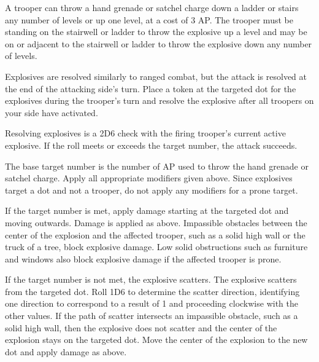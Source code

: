 A trooper can throw a hand grenade or satchel charge down a ladder or stairs any number of levels or up one level, at a cost of 3 AP.
The trooper must be standing on the stairwell or ladder to throw the explosive up a level and may be on or adjacent to the stairwell or ladder to throw the explosive down any number of levels.

Explosives are resolved similarly to ranged combat, but the attack is resolved at the end of the attacking side's turn.
Place a token at the targeted dot for the explosives during the trooper's turn and resolve the explosive after all troopers on your side have activated.

Resolving explosives is a 2D6 check with the firing trooper's current active explosive.
If the roll meets or exceeds the target number, the attack succeeds.

The base target number is the number of AP used to throw the hand grenade or satchel charge.
Apply all appropriate modifiers given above.
Since explosives target a dot and not a trooper, do not apply any modifiers for a prone target.

If the target number is met, apply damage starting at the targeted dot and moving outwards.
Damage is applied as above.
Impassible obstacles between the center of the explosion and the affected trooper, such as a solid high wall or the truck of a tree, block explosive damage.
Low solid obstructions such as furniture and windows also block explosive damage if the affected trooper is prone.

If the target number is not met, the explosive scatters.
The explosive scatters from the targeted dot.
Roll 1D6 to determine the scatter direction, identifying one direction to correspond to a result of 1 and proceeding clockwise with the other values.
If the path of scatter intersects an impassible obstacle, such as a solid high wall, then the explosive does not scatter and the center of the explosion stays on the targeted dot.
Move the center of the explosion to the new dot and apply damage as above.
